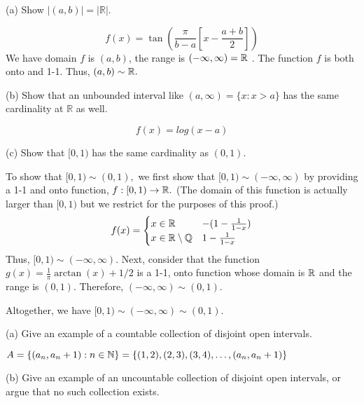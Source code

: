 \documentclass{report}
\begin{document}
(a) Show $|(a, b)|=|\mathbb{R}|$. 


\sol
$$
f(x) = \tan\left(\frac{\pi}{b-a}\left[x - \frac{a+b}{2}\right]\right)
$$
We have domain $f$ is $(a,b)$, the range is $(-\infty, \infty) = \RR$ . The function $f$ is both onto and 1-1. Thus, $(a,b) \sim \RR.$

\par \bigskip
(b) Show that an unbounded interval like $(a, \infty)=\{x: x>a\}$ has the same cardinality at $\mathbb{R}$ as well.

\sol
$$
f(x)=log(x-a)
$$

\par \bigskip
(c) Show that $[0,1)$ has the same cardinality as $(0,1)$. 



\sol
    
To show that $[0,1) \sim (0,1),$ we first show that $[0,1) \sim (-\infty, \infty)$ by providing a 1-1 and onto function, $f: [0,1) \rightarrow \RR.$ (The domain of this function is actually larger than $[0,1)$ but we restrict for the purposes of this proof.)
$$ f(x) = 
  \begin{cases} 
  x \in \RR & -(1- \frac{1}{1-x}) \\
  x \in \RR \setminus \QQ & 1- \frac{1}{1-x}
   \end{cases}
$$
Thus, $[0,1) \sim (-\infty, \infty)$. Next, consider that the function $g(x)= \frac{1}{\pi}\arctan(x) + 1/2$ is a 1-1, onto function whose domain is $\RR$ and the range is $(0,1).$ Therefore, $(-\infty, \infty) \sim (0,1).$
\par
Altogether, we have $[0,1) \sim (-\infty, \infty) \sim (0,1).$

\sol


 (a) Give an example of a countable collection of disjoint open intervals.
\par \bigskip

$A=\{(a_n,a_n+1): n \in \NN\} = \{(1,2),(2,3),(3,4),\dots,(a_n,a_n+1)\}$

\par \bigskip

 (b) Give an example of an uncountable collection of disjoint open intervals, or argue that no such collection exists.
\end{document}
